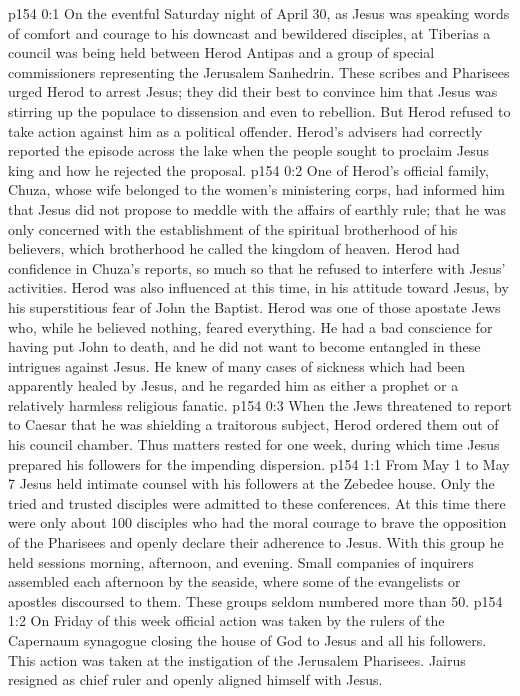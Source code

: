 \author{Midwayer Commission}
\vs p154 0:1 On the eventful Saturday night of April 30, as Jesus was speaking words of comfort and courage to his downcast and bewildered disciples, at Tiberias a council was being held between Herod Antipas and a group of special commissioners representing the Jerusalem Sanhedrin. These scribes and Pharisees urged Herod to arrest Jesus; they did their best to convince him that Jesus was stirring up the populace to dissension and even to rebellion. But Herod refused to take action against him as a political offender. Herod’s advisers had correctly reported the episode across the lake when the people sought to proclaim Jesus king and how he rejected the proposal.
\vs p154 0:2 One of Herod’s official family, Chuza, whose wife belonged to the women’s ministering corps, had informed him that Jesus did not propose to meddle with the affairs of earthly rule; that he was only concerned with the establishment of the spiritual brotherhood of his believers, which brotherhood he called the kingdom of heaven. Herod had confidence in Chuza’s reports, so much so that he refused to interfere with Jesus’ activities. Herod was also influenced at this time, in his attitude toward Jesus, by his superstitious fear of John the Baptist. Herod was one of those apostate Jews who, while he believed nothing, feared everything. He had a bad conscience for having put John to death, and he did not want to become entangled in these intrigues against Jesus. He knew of many cases of sickness which had been apparently healed by Jesus, and he regarded him as either a prophet or a relatively harmless religious fanatic.
\vs p154 0:3 When the Jews threatened to report to Caesar that he was shielding a traitorous subject, Herod ordered them out of his council chamber. Thus matters rested for one week, during which time Jesus prepared his followers for the impending dispersion.
\vs p154 1:1 From May 1 to May 7 Jesus held intimate counsel with his followers at the Zebedee house. Only the tried and trusted disciples were admitted to these conferences. At this time there were only about 100 disciples who had the moral courage to brave the opposition of the Pharisees and openly declare their adherence to Jesus. With this group he held sessions morning, afternoon, and evening. Small companies of inquirers assembled each afternoon by the seaside, where some of the evangelists or apostles discoursed to them. These groups seldom numbered more than 50.
\vs p154 1:2 On Friday of this week official action was taken by the rulers of the Capernaum synagogue closing the house of God to Jesus and all his followers. This action was taken at the instigation of the Jerusalem Pharisees. Jairus resigned as chief ruler and openly aligned himself with Jesus.
